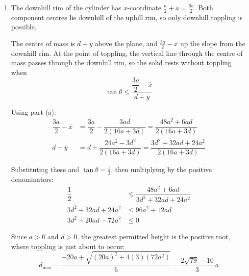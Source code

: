 \documentclass[leqno]{article}
\begin{document}
\begin{enumerate}[
  label=\textbf{\arabic*.},
  leftmargin=*,
  topsep=0pt,
  partopsep=0pt,
  parsep=0pt
]
\begin{djsSolution}
\begin{enumerate}[label=\textbf{(\alph*)}, start=1]
where \(M=\sum m_i\) is the total mass. Substituting and cancelling the common factor \(\rho\pi a^2\):
\begin{align*}
\left(\dfrac{16a}{3}+d\right)\bar{x}&=\dfrac{16a}{3}(0)+d\left(\dfrac a2\right)\\
\bar{x}&=\dfrac{3ad}{2(16a+3d)}\\
\left(\dfrac{16a}{3}+d\right)\bar{y}&=\dfrac{16a}{3}\left(\dfrac{3a}{4}\right)+d\left(-\dfrac d2\right)\\
\bar{y}&=\dfrac{24a^2-3d^2}{2(16a+3d)}
\end{align*}

Hence the required coordinates are
\[
(\bar{x},\bar{y})
=\left(\frac{3ad}{2(16a+3d)},\frac{24a^2-3d^2}{2(16a+3d)}\right)
\]

\item The downhill rim of the cylinder has \(x\)-coordinate \(\frac a2+a=\frac{3a}{2}\). Both component centres lie downhill of the uphill rim, so only downhill toppling is possible.

The centre of mass is \(d+\bar{y}\) above the plane, and \(\frac{3a}{2}-\bar{x}\) up the slope from the downhill rim. At the point of toppling, the vertical line through the centre of mass passes through the downhill rim, so the solid rests without toppling when
\[
\tan\theta\leq\dfrac{\dfrac{3a}{2}-\bar{x}}{d+\bar{y}}
\]

Using part (a):
\begin{align*}
\dfrac{3a}{2}-\bar{x}&=\dfrac{3a}{2}-\dfrac{3ad}{2(16a+3d)}=\dfrac{48a^2+6ad}{2(16a+3d)}\\
d+\bar{y}&=d+\dfrac{24a^2-3d^2}{2(16a+3d)}=\dfrac{3d^2+32ad+24a^2}{2(16a+3d)}
\end{align*}

Substituting these and \(\tan\theta=\frac12\), then multiplying by the positive denominators:
\begin{align*}
\dfrac12&\leq\dfrac{48a^2+6ad}{3d^2+32ad+24a^2}\\
3d^2+32ad+24a^2&\leq 96a^2+12ad\\
3d^2+20ad-72a^2&\leq 0
\end{align*}

Since \(a>0\) and \(d>0\), the greatest permitted height is the positive root, where toppling is just about to occur:
\[
d_{\max}=\frac{-20a+\sqrt{(20a)^2+4(3)(72a^2)}}{6}
=\frac{2\sqrt{79}-10}{3}\,a
\]

\end{enumerate}
\end{djsSolution}


\end{enumerate}
\end{document}
